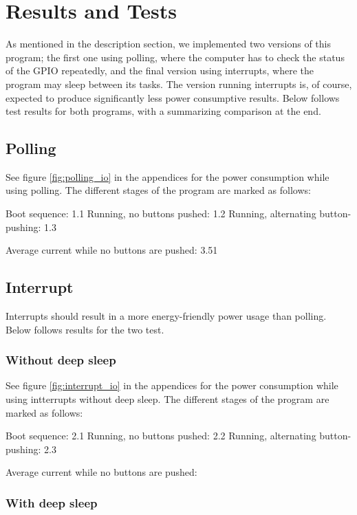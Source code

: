 \section{Results and Tests}

As mentioned in the description section, we implemented two versions of this program; the first one using polling, where the computer has to check the status of the GPIO repeatedly, and the final version using interrupts, where the program may sleep between its tasks. The version running interrupts is, of course, expected to produce significantly less power consumptive results. Below follows test results for both programs, with a summarizing comparison at the end.

\subsection{Polling}

See figure \ref{fig:polling_io} in the appendices for the power consumption while using polling. The different stages of the program are marked as follows:

Boot sequence: 1.1
Running, no buttons pushed: 1.2
Running, alternating button-pushing: 1.3

Average current while no buttons are pushed: 3.51

\subsection{Interrupt}

Interrupts should result in a more energy-friendly power usage than polling. Below follows results for the two test.

\subsubsection{Without deep sleep}

See figure \ref{fig:interrupt_io} in the appendices for the power consumption while using intterrupts without deep sleep. The different stages of the program are marked as follows:

Boot sequence: 2.1
Running, no buttons pushed: 2.2
Running, alternating button-pushing: 2.3

Average current while no buttons are pushed: 

\subsubsection{With deep sleep}


